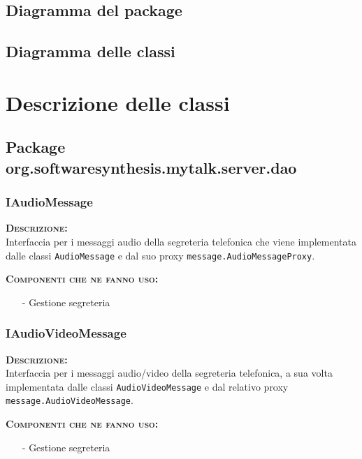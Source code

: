 \subsection{Diagramma del package}

\subsection{Diagramma delle classi}
\clearpage

\section{Descrizione delle classi}

\subsection{Package org.softwaresynthesis.mytalk.server.dao}
\subsubsection{IAudioMessage}
\begin{description}
	\item{\scshape\bfseries Descrizione:}\\
Interfaccia per i messaggi audio della segreteria telefonica che viene implementata dalle classi \texttt{AudioMessage} e dal suo proxy \texttt{message.AudioMessageProxy}.
	\item{\scshape\bfseries Componenti che ne fanno uso:}\\
	  \begin{itemize}
	    \item[-] Gestione segreteria
	  \end{itemize}
\end{description}

\subsubsection{IAudioVideoMessage}
\begin{description}
	\item{\scshape\bfseries Descrizione:}\\
Interfaccia per i messaggi audio/video della segreteria telefonica, a sua volta implementata dalle classi \texttt{AudioVideoMessage} e dal relativo proxy \texttt{message.AudioVideoMessage}.
	\item{\scshape\bfseries Componenti che ne fanno uso:} 
	  \begin{itemize}
	    \item[-] Gestione segreteria
	  \end{itemize}
\end{description}

